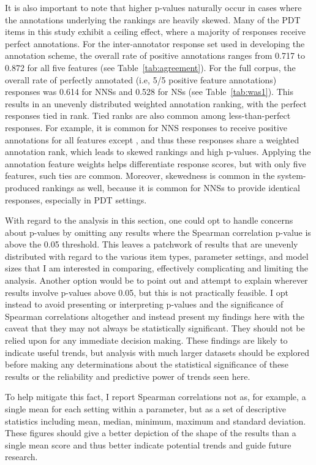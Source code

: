 It is also important to note that higher p-values naturally occur in cases where the annotations underlying the rankings are heavily skewed. Many of the PDT items in this study exhibit a ceiling effect, where a majority of responses receive perfect annotations. For the inter-annotator response set used in developing the annotation scheme, the overall rate of positive annotations ranges from 0.717 to 0.872 for all five features (see Table~\ref{tab:agreement}). For the full corpus, the overall rate of perfectly annotated (i.e, 5/5 positive feature annotations) responses was 0.614 for NNSs and 0.528 for NSs (see Table~\ref{tab:was1}).
This results in an unevenly distributed weighted annotation ranking, with the perfect responses tied in rank. Tied ranks are also common among less-than-perfect responses. For example, it is common for NNS responses to receive positive annotations for all features except , and thus these responses share a weighted annotation rank, which leads to skewed rankings and high p-values. Applying the annotation feature weights helps differentiate response scores, but with only five features, such ties are common. Moreover, skewedness is common in the system-produced rankings as well, because it is common for NNSs to provide identical responses, especially in  PDT settings.

With regard to the analysis in this section, one could opt to handle concerns about p-values by omitting any results where the Spearman correlation p-value is above the 0.05 threshold. This leaves a patchwork of results that are unevenly distributed with regard to the various item types, parameter settings, and model sizes that I am interested in comparing, effectively complicating and limiting the analysis. Another option would be to point out and attempt to explain wherever results involve p-values above 0.05, but this is not practically feasible. I opt instead to avoid presenting or interpreting p-values and the significance of Spearman correlations altogether and instead present my findings here with the caveat that they may not always be statistically significant. They should not be relied upon for any immediate decision making. These findings are likely to indicate useful trends, but analysis with much larger datasets should be explored before making any determinations about the statistical significance of these results or the reliability and predictive power of trends seen here.

To help mitigate this fact, I report Spearman correlations not as, for example, a single mean for each setting within a parameter, but as a set of descriptive statistics including mean, median, minimum, maximum and standard deviation. These figures should give a better depiction of the shape of the results than a single mean score and thus better indicate potential trends and guide future research.

